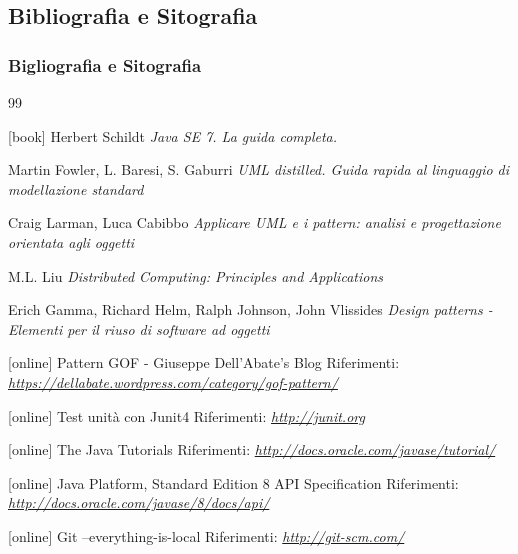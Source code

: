 \subsection {Bibliografia e Sitografia}
\begin {frame} [allowframebreaks] 
  \frametitle {Bigliografia e Sitografia}
  \begin {thebibliography}{99}
   {\tiny 
     [book]
      Herbert Schildt
     \newblock \emph{Java SE 7. La guida completa.} 

       Martin Fowler, L. Baresi, S. Gaburri 
     \newblock \emph{UML distilled. Guida rapida al linguaggio di modellazione standard} 

      Craig Larman, Luca Cabibbo
     \newblock \emph{Applicare UML e i pattern: analisi e progettazione orientata agli oggetti} 

      M.L. Liu
     \newblock \emph{Distributed Computing: Principles and Applications} 

      Erich Gamma, Richard Helm, Ralph Johnson, John Vlissides
     \newblock \emph{Design patterns - Elementi per il riuso di software ad oggetti} 
      
     [online]
      Pattern GOF - Giuseppe Dell'Abate's Blog
     \newblock Riferimenti: \emph{\url{https://dellabate.wordpress.com/category/gof-pattern/ }}

     [online]
      Test unità con Junit4
     \newblock Riferimenti: \emph{\url{http://junit.org }}

     [online]
      The Java Tutorials 
     \newblock Riferimenti: \emph{\url{http://docs.oracle.com/javase/tutorial/ }}

     [online]
      Java Platform, Standard Edition 8 API Specification 
     \newblock Riferimenti: \emph{\url{http://docs.oracle.com/javase/8/docs/api/ }}

     [online]
      Git --everything-is-local  
     \newblock Riferimenti: \emph{\url{http://git-scm.com/ }}

}
\end{thebibliography}
\end{frame}
